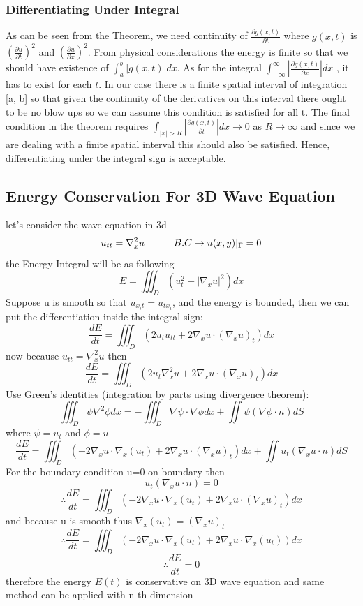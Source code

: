 \documentclass[]{article}
\begin{document}
\subsubsection*{Differentiating Under Integral}
As can be seen from the Theorem, we need continuity of 
$\displaystyle \frac{\partial g(x, t)}{\partial t}$
where $g(x,t)$ is 
$\displaystyle {\left(\frac{\partial u}{\partial t}\right)}^2$
and
$\displaystyle {\left(\frac{\partial u}{\partial x}\right)}^2$. 
From physical considerations the energy is finite so that we should have existence of
$\displaystyle \int_{a}^{b} |g(x,t)|dx$. As for the integral
$\displaystyle \int_{-\infty}^{\infty} \left|\frac{\partial g(x,t)}{\partial x}\right|dx$
, it has to exist for each $t$. In our case there is a finite spatial interval of integration
[a, b] so that given the continuity of the derivatives on this interval there ought
to be no blow ups so we can assume this condition is satisfied for all t. 
The final condition in the theorem requires
$\displaystyle \int_{|x|>R} |\frac{\partial g(x,t)}{\partial t}| dx \to 0 $ as $R \to \infty$
and since we are dealing with a finite spatial interval this should also be satisfied.
Hence, differentiating under the integral sign is acceptable.

\subsection{Energy Conservation For 3D Wave Equation}
let's consider the wave equation in 3d
\[
u_{tt} = \nabla_x^2 u \quad\quad\quad B.C \to u(x,y)|_\Gamma = 0
\]
the Energy Integral will be as following
\[
    E = \iiint_{D}(u_t^2 + |\nabla_x u|^2) dx
\]
Suppose u is smooth so that $u_{x_{i}t}=u_{t x_{i}}$, 
and the energy is bounded, then we can put the differentiation inside the integral sign:
\[
\frac{dE}{dt} = \iiint_{D}(  2 u_t u_{tt} + 2 \nabla_x u \cdot (\nabla_x u)_t) dx
\]
now because $u_{tt} = \nabla_x^2 u$ then
\[
    \frac{dE}{dt} = \iiint_{D}(  2 u_t \nabla_x^2 u + 2 \nabla_x u \cdot (\nabla_x u)_t) dx
\]
Use Green's identities (integration by parts using divergence theorem):
\[
    \iiint_{D} \psi \nabla^2 \phi dx = -\iiint_{D} \nabla \psi \cdot \nabla \phi dx + \iint \psi (\nabla \phi \cdot n )dS
\]
where $\psi = u_t $ and  $\phi = u$
\[
    \frac{dE}{dt} = \iiint_{D}( -2 \nabla_x u \cdot \nabla_x (u_t) + 2\nabla_x u \cdot (\nabla_x u)_t) dx  + \iint u_t(\nabla_x u \cdot n )dS
\]
For the boundary condition u=0 on boundary then 
\[
    u_t(\nabla_x u \cdot n ) = 0
\]
\[
  \therefore  \frac{dE}{dt} = \iiint_{D}( -2 \nabla_x u \cdot \nabla_x (u_t) + 2\nabla_x u \cdot (\nabla_x u)_t) dx
\]
and because u is smooth thus $\nabla_x (u_t) =(\nabla_x u)_t$
\[
  \therefore  \frac{dE}{dt} = \iiint_{D}( -2 \nabla_x u \cdot \nabla_x (u_t) + 2 \nabla_x u \cdot \nabla_x (u_t)) dx
\]
\[
    \therefore  \frac{dE}{dt} = 0
\]
therefore the energy $E(t)$ is conservative on 3D wave equation and same method can be applied with n-th dimension
\end{document}
